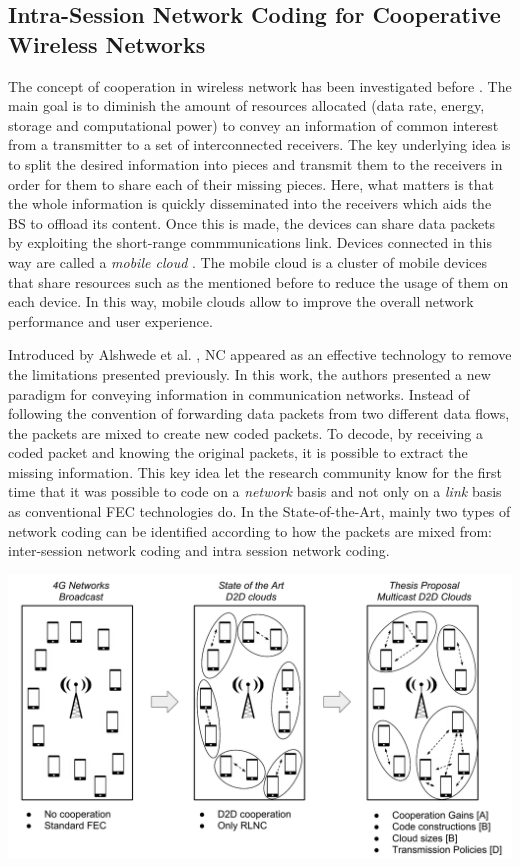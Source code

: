 \subsection{Intra-Session Network Coding for Cooperative Wireless Networks}
The concept of cooperation in wireless network has been investigated before \cite{fitzek2006cooperation,fitzek2013mobile}. The main goal is to diminish the amount of resources allocated (data rate, energy, storage and computational power) to convey an information of common interest from a transmitter to a set of interconnected receivers. The key underlying idea is to split the desired information into pieces and transmit them to the receivers in order for them to share each of their missing pieces. Here, what matters is that the whole information is quickly disseminated into the receivers which aids the \ac{BS} to offload its content. Once this is made, the devices can share data packets by exploiting the short-range commmunications link. Devices connected in this way are called a \textit{mobile cloud} \cite{fitzek2013mobile}. The mobile cloud is a cluster of mobile devices that share resources such as the mentioned before to reduce the usage of them on each device. In this way, mobile clouds allow to improve the overall network performance and user experience.

Introduced by Alshwede et al. \cite{ahlswede2000network}, \ac{NC} appeared as an effective technology to remove the limitations presented previously. In this work, the authors presented a new paradigm for conveying information in communication networks. Instead of following the convention of forwarding data packets from two different data flows, the packets are mixed to create new coded packets. To decode, by receiving a coded packet and knowing the original packets, it is possible to extract the missing information. This key idea let the research community know for the first time that it was possible to code on a \textit{network} basis and not only on a \textit{link} basis as conventional \ac{FEC} technologies do. In the State-of-the-Art, mainly two types of network coding can be identified according to how the packets are mixed from: inter-session network coding and intra session network coding. 


\includegraphics[width=\textwidth]{introduction/figures/thesis-diagrams.pdf}